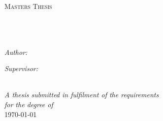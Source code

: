 \documentclass[11pt, oneside]{Thesis}
\begin{document}
\begin{titlepage}
\begin{center}

\textsc{\LARGE \deptname}\\ %
\textsc{\LARGE \univname}\\[1.5cm] %
\textsc{\Large Masters Thesis}\\[0.5cm] %

\HRule \\[0.4cm] %
{\huge \bfseries \ttitle}\\[0.4cm] %
\HRule \\[1.5cm] %

\begin{minipage}{0.4\textwidth}
\begin{flushleft} \large
\emph{Author:}\\
\href{http://www.rabipanda.com}{\authornames}
\end{flushleft}
\end{minipage}
\begin{minipage}{0.4\textwidth}
\begin{flushright} \large
\emph{Supervisor:} \\
\href{http://www.cis.unimelb.edu.au/people/staff.php?person_ID=618008}{\supname}
\end{flushright}
\end{minipage}\\[3cm]

\large \textit{A thesis submitted in fulfilment of the requirements\\ for the degree of
\degreename}\\[0.3cm]


{\large \today}\\[4cm] %

\vfill
\end{center}

\end{titlepage}

\end{document}

